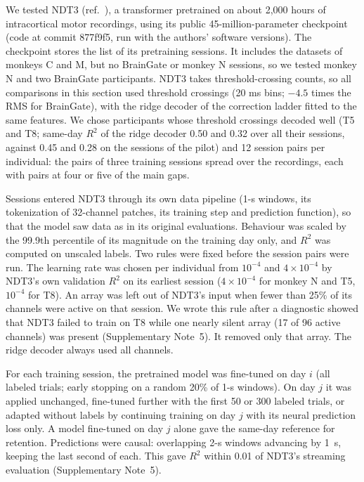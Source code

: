 \documentclass{iopjournal}
\begin{document}
We tested NDT3 (ref.~\cite{ye2025ndt3}), a transformer pretrained on about 2,000 hours of intracortical motor recordings, using
its public 45-million-parameter checkpoint (code at commit 877f9f5, run with the authors' software versions). The
checkpoint stores the list of its pretraining sessions. It includes the datasets of monkeys C and M, but no BrainGate or
monkey N sessions, so we tested monkey N and two BrainGate participants. NDT3 takes threshold-crossing counts, so all
comparisons in this section used threshold crossings (20 ms bins; $-4.5$ times the RMS for BrainGate), with the ridge
decoder of the correction ladder fitted to the same features. We chose participants whose threshold crossings decoded
well (T5 and T8; same-day $R^2$ of the ridge decoder 0.50 and 0.32 over all their sessions, against 0.45 and 0.28 on
the sessions of the pilot) and 12 session pairs per individual: the pairs of three
training sessions spread over the recordings, each with pairs at four or five of the main gaps.

Sessions entered NDT3 through its own data pipeline (1-s windows, its tokenization of 32-channel patches, its training
step and prediction function), so that the model saw data as in its original evaluations. Behaviour was scaled by the
99.9th percentile of its magnitude on the training day only, and $R^2$ was computed on unscaled labels. Two rules
were fixed before the session pairs were run. The learning rate was chosen per individual from $10^{-4}$ and
$4 \times 10^{-4}$ by NDT3's own validation $R^2$ on its earliest session ($4 \times 10^{-4}$ for monkey N and T5,
$10^{-4}$ for T8). An array was left out of NDT3's input when fewer than 25\% of its channels were active on that session.
We wrote this rule after a diagnostic showed that NDT3 failed to train on T8 while one nearly silent array (17 of 96
active channels) was present (Supplementary Note~5). It removed only that array. The ridge decoder always used all
channels.

For each training session, the pretrained model was fine-tuned on day $i$ (all labeled trials; early stopping on a random
20\% of 1-s windows). On day $j$ it was applied unchanged, fine-tuned further with the first 50 or 300 labeled trials, or
adapted without labels by continuing training on day $j$ with its neural prediction loss only. A model fine-tuned on
day $j$ alone gave the same-day reference for retention. Predictions were causal: overlapping 2-s windows advancing by
1~s, keeping the last second of each. This gave $R^2$ within 0.01 of NDT3's streaming evaluation (Supplementary Note~5).
\end{document}
